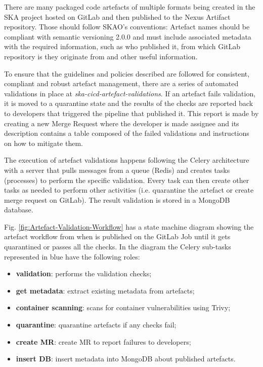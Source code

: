 \documentclass[a4paper,
	       keeplastbox,   %
	       References
	       ]{jacow}
\begin{document}
There are many packaged code artefacts of multiple formats being created in the SKA project hosted on GitLab and then published to the Nexus Artifact repository. Those should follow SKAO's conventions: Artefact names should be compliant with semantic versioning 2.0.0\cite{semver} and must include associated metadata with the required information, such as who published it, from which GitLab repository is they originate from and other useful information.

To ensure that the guidelines and policies described are followed for consistent, compliant and robust artefact management, there are a series of automated validations in place at \textit{ska-cicd-artefact-validations}\cite{ska-cicd-artefact-validations}.  If an artefact fails validation, it is moved to a quarantine state and the results of the checks are reported back to developers that triggered the pipeline that published it. This report is made by creating a new Merge Request where the developer is made assignee and its description contains a table composed of the failed validations and instructions on how to mitigate them.

The execution of artefact validations happens following the Celery architecture with a server that pulls messages from a queue (Redis) and creates tasks (processes) to perform the specific validation. Every task can then create other tasks as needed to perform other activities (i.e. quarantine the artefact or create merge request on GitLab). The result validation is stored in a MongoDB database. 

Fig. \ref{fig:Artefact-Validation-Workflow} has a state machine diagram showing the artefact workflow from when is published on the GitLab Job until it gets quarantined or passes all the checks. In the diagram the Celery sub-tasks represented in blue have the following roles:

\begin{itemize}
	\setlength\itemsep{0.1em}
    \item \textbf{validation}: performs the validation checks;
    \item \textbf{get metadata}: extract existing metadata from artefacts;
    \item \textbf{container scanning}: scans for container vulnerabilities using Trivy;
    \item \textbf{quarantine}: quarantine artefacts if any checks fail;
    \item \textbf{create MR}: create MR to report failures to developers;
    \item \textbf{insert DB}: insert metadata into MongoDB about published artefacts.
\end{itemize}
\end{document}
